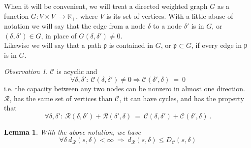 \documentclass{article}
\theoremstyle{plain}
\newtheorem{lem}[teo]{Lemma}
\theoremstyle{definition}
\theoremstyle{remark}
\newtheorem{oss}{Observation}
\begin{document}
When it will be convenient, we will treat a directed weighted graph $G$ as a function $G: V\times V\ \rightarrow \mathbb{R_{+}}$, where $V$ is its set of vertices. With a little abuse of notation we will say that the edge from a node $\delta$ to a node $\delta'$ is in $G$, or $(\delta, \delta') \in G$,  in place of $G(\delta, \delta') \not= 0$.\\
Likewise we will say that a path $\mathfrak{p}$ is contained in $G$, or $\mathfrak{p}\subset G$, if every edge in $\mathfrak{p}$ is in $G$.\\
\begin{oss} $\mathcal{C}$ is acyclic and
\begin{equation}
\forall \delta, \delta':\ \mathcal{C}(\delta, \delta')\not= 0 \Rightarrow \mathcal{C}(\delta', \delta)\ =\ 0
\end{equation}
  i.e. the capacity between any two nodes can be nonzero in almost one direction.\\
$\mathcal{R}$, has the same set of vertices than $\mathcal{C}$, it can have cycles, and has the property that 
\begin{equation}
\forall \delta, \delta':\ \mathcal{R}(\delta, \delta')+\mathcal{R}(\delta', \delta)\ =\ \mathcal{C}(\delta, \delta')+\mathcal{C}(\delta', \delta)\ .
\end{equation}
\end{oss}
\begin{lem}
With the above notation, we have
\begin{equation*}
\forall \delta\ d_\mathcal{R}(s, \delta)<\infty\ \Rightarrow\  d_{\mathcal{R}}(s, \delta) \le D_{\mathcal{C}}(s, \delta)
\end{equation*}
\end{lem}
\end{document}
